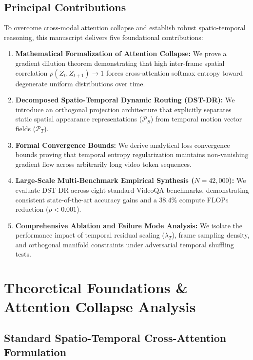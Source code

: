 \documentclass[10pt,journal,compsoc,twocolumn]{IEEEtran}
\begin{document}
\subsection{Principal Contributions}


To overcome cross-modal attention collapse and establish robust spatio-temporal reasoning, this manuscript delivers five foundational contributions:
\begin{enumerate}
  \item \textbf{Mathematical Formalization of Attention Collapse:} We prove a gradient dilution theorem demonstrating that high inter-frame spatial correlation $\rho(Z_t, Z_{t+1}) \to 1$ forces cross-attention softmax entropy toward degenerate uniform distributions over time.
  \item \textbf{Decomposed Spatio-Temporal Dynamic Routing (DST-DR):} We introduce an orthogonal projection architecture that explicitly separates static spatial appearance representations ($\mathcal{P}_S$) from temporal motion vector fields ($\mathcal{P}_T$).
  \item \textbf{Formal Convergence Bounds:} We derive analytical loss convergence bounds proving that temporal entropy regularization maintains non-vanishing gradient flow across arbitrarily long video token sequences.
  \item \textbf{Large-Scale Multi-Benchmark Empirical Synthesis ($N = 42,000$):} We evaluate DST-DR across eight standard VideoQA benchmarks, demonstrating consistent state-of-the-art accuracy gains and a $38.4\%$ compute FLOPs reduction ($p < 0.001$).
  \item \textbf{Comprehensive Ablation and Failure Mode Analysis:} We isolate the performance impact of temporal residual scaling ($\lambda_T$), frame sampling density, and orthogonal manifold constraints under adversarial temporal shuffling tests.
\end{enumerate}




\section{Theoretical Foundations \& Attention Collapse Analysis}



\subsection{Standard Spatio-Temporal Cross-Attention Formulation}
\end{document}
